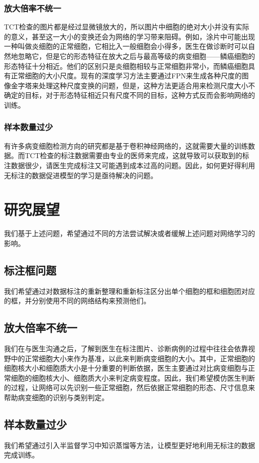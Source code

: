 \subsubsection{放大倍率不统一}
\par TCT检查的图片都是经过显微镜放大的，所以图片中细胞的绝对大小并没有实际的意义，甚至这一大小的变换还会为网络的学习带来阻碍。例如，涂片中可能出现一种叫做炎细胞的正常细胞，它相比入一般细胞会小得多，医生在做诊断时可以自然地忽略它，但是它的形态特征在放大之后与最高等级的病变细胞——鳞癌细胞的形态特征十分相近。他们的区别只是炎细胞相较与正常细胞非常小，而鳞癌细胞具有正常细胞的大小尺度。现有的深度学习方法主要通过FPN来生成各种尺度的图像金字塔来处理这种尺度变换的问题，但是，这种方法更适合用来检测尺度大小不确定的目标，对于形态特征相近只有尺度不同的目标，这种方式反而会影响网络的训练。
\subsubsection{样本数量过少}
\par 有许多病变细胞检测方向的研究都是基于卷积神经网络的，这就需要大量的训练数据。而TCT检查的标注数据需要由专业的医师来完成，这就导致可以获取到的标注数据很少，请医生完成标注又可能遇到成本过高的问题。因此，如何更好得利用无标注的数据促进模型的学习是亟待解决的问题。

\section{研究展望}
\par 我们基于上述问题，希望通过不同的方法尝试解决或者缓解上述问题对网络学习的影响。

\subsection{标注框问题}
\par 我们希望通过对数据标注的重新整理和重新标注区分出单个细胞的框和细胞团对应的框，并分别使用不同的网络结构来预测他们。

\subsection{放大倍率不统一}
\par 我们在与医生沟通之后，了解到医生在标注图片、诊断病例的过程中往往会依靠视野中的正常细胞大小来作为基准，以此来判断病变细胞的大小。其中，正常细胞的细胞核大小和细胞质大小是十分重要的判断依据，医生主要通过对比病变细胞与正常细胞的细胞核大小、细胞质大小来判定病变程度。因此，我们希望模仿医生判断的过程，让网络可以先识别一些正常细胞，然后依据正常细胞的形态、尺寸信息来帮助病变细胞的识别与类别判定。

\subsection{样本数量过少}
\par 我们希望通过引入半监督学习中知识蒸馏等方法，让模型更好地利用无标注的数据完成训练。

\newpage
\begingroup
\linespread{1}
\printbibliography[title={参考文献}]
\endgroup
